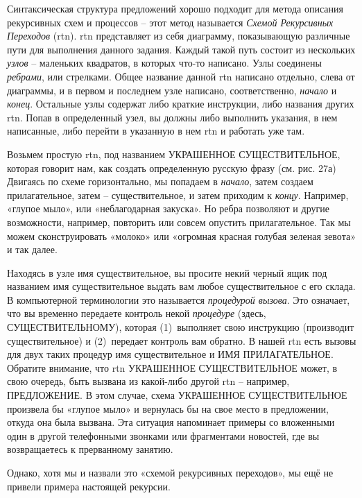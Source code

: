 \documentclass[../main.tex]{subfiles}
\begin{document}
Синтаксическая структура предложений хорошо подходит для метода описания рекурсивных схем и процессов \--- этот метод называется \emph{Схемой Рекурсивных Переходов} (\acs{rtn}). \Acs{rtn} представляет из себя диаграмму, показывающую различные пути для выполнения данного задания. Каждый такой путь состоит из нескольких \emph{узлов} \--- маленьких квадратов, в которых что-то написано. Узлы соединены \emph{ребрами}, или стрелками. Общее название данной \acs{rtn} написано отдельно, слева от диаграммы, и в первом и последнем узле написано, соответственно, \emph{начало} и \emph{конец}. Остальные узлы содержат либо краткие инструкции, либо названия других \acs{rtn}\@. Попав в определенный узел, вы должны либо выполнить указания, в нем написанные, либо перейти в указанную в нем \acs{rtn} и работать уже там.

Возьмем простую \acs{rtn}, под названием УКРАШЕННОЕ СУЩЕСТВИТЕЛЬНОЕ, которая говорит нам, как создать определенную русскую фразу (см. рис. 27а) Двигаясь по схеме горизонтально, мы попадаем в \emph{начало}, затем создаем прилагательное, затем \--- существительное, и затем приходим к \emph{концу}. Например, «глупое мыло», или «неблагодарная закуска». Но ребра позволяют и другие возможности, например, повторить или совсем опустить прилагательное. Так мы можем сконструировать «молоко» или «огромная красная голубая зеленая зевота» и так далее.

Находясь в узле имя существительное, вы просите некий черный ящик под названием имя существительное выдать вам любое существительное с его склада. В компьютерной терминологии это называется \emph{процедурой вызова}. Это означает, что вы временно передаете контроль некой \emph{процедуре} (здесь, СУЩЕСТВИТЕЛЬНОМУ), которая (1)~выполняет свою инструкцию (производит существительное) и (2)~передает контроль вам обратно. В нашей \acs{rtn} есть вызовы для двух таких процедур имя существительное и ИМЯ ПРИЛАГАТЕЛЬНОЕ\@. Обратите внимание, что \acs{rtn} УКРАШЕННОЕ СУЩЕСТВИТЕЛЬНОЕ может, в свою очередь, быть вызвана из какой-либо другой \acs{rtn} \--- например, ПРЕДЛОЖЕНИЕ\@. В этом случае, схема УКРАШЕННОЕ СУЩЕСТВИТЕЛЬНОЕ произвела бы «глупое мыло» и вернулась бы на свое место в предложении, откуда она была вызвана. Эта ситуация напоминает примеры со вложенными один в другой телефонными звонками или фрагментами новостей, где вы возвращаетесь к прерванному занятию.

Однако, хотя мы и назвали это «схемой рекурсивных переходов», мы ещё не привели примера настоящей рекурсии.
\end{document}
